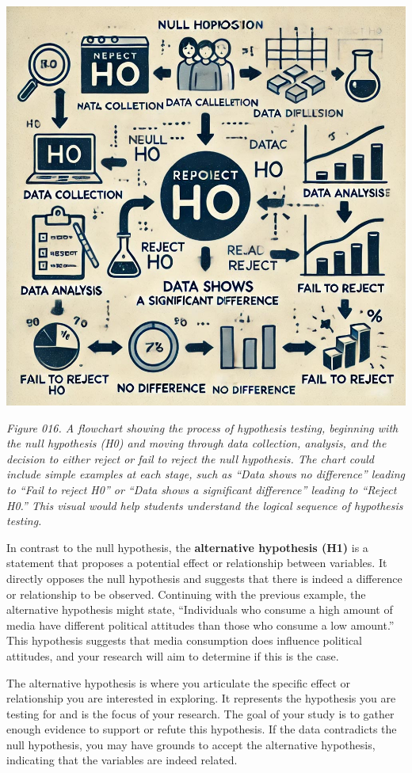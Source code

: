 \documentclass[
]{book}
\begin{document}
\includegraphics[width=1\linewidth,height=\textheight,keepaspectratio]{images/fig016.jpg}

\emph{Figure 016. A flowchart showing the process of hypothesis testing, beginning with the null hypothesis (H0) and moving through data collection, analysis, and the decision to either reject or fail to reject the null hypothesis. The chart could include simple examples at each stage, such as ``Data shows no difference'' leading to ``Fail to reject H0'' or ``Data shows a significant difference'' leading to ``Reject H0.'' This visual would help students understand the logical sequence of hypothesis testing.}

In contrast to the null hypothesis, the \textbf{alternative hypothesis (H1)} is a statement that proposes a potential effect or relationship between variables. It directly opposes the null hypothesis and suggests that there is indeed a difference or relationship to be observed. Continuing with the previous example, the alternative hypothesis might state, ``Individuals who consume a high amount of media have different political attitudes than those who consume a low amount.'' This hypothesis suggests that media consumption does influence political attitudes, and your research will aim to determine if this is the case.

The alternative hypothesis is where you articulate the specific effect or relationship you are interested in exploring. It represents the hypothesis you are testing for and is the focus of your research. The goal of your study is to gather enough evidence to support or refute this hypothesis. If the data contradicts the null hypothesis, you may have grounds to accept the alternative hypothesis, indicating that the variables are indeed related.
\end{document}
